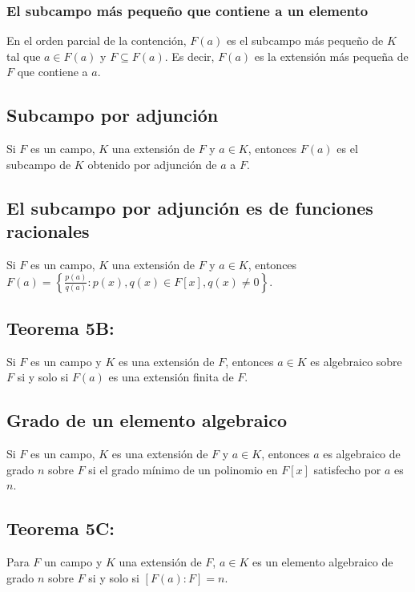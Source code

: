 \documentclass{article}
\begin{document}
\subsubsection*{\color{teal} El subcampo más pequeño que contiene a un elemento}

En el orden parcial de la contención, $F(a)$ es el subcampo más pequeño de $K$ tal que $a\in F(a)$ y $F\subseteq F(a)$. Es decir, $F(a)$ es la extensión más pequeña de $F$ que contiene a $a$. 

\subsection*{\color{violet} Subcampo por adjunción}

Si $F$ es un campo, $K$ una extensión de $F$ y $a\in K$, entonces $F(a)$ es el subcampo de $K$ obtenido por adjunción de $a$ a $F$.
 
\subsection*{\color{purple} El subcampo por adjunción es de funciones racionales}

Si $F$ es un campo, $K$ una extensión de $F$ y $a\in K$, entonces $F(a)=\left\{\displaystyle\frac{p(a)}{q(a)}: p(x),q(x)\in F[x], q(x)\neq0\right\}$.

\subsection*{\color{red} Teorema 5B:}

Si $F$ es un campo y $K$ es una extensión de $F$, entonces $a\in K$ es algebraico sobre $F$ si y solo si $F(a)$ es una extensión finita de $F$.

\subsection*{\color{violet} Grado de un elemento algebraico}

Si $F$ es un campo, $K$ es una extensión de $F$ y $a\in K$, entonces $a$ es algebraico de grado $n$ sobre $F$ si el grado mínimo de un polinomio en $F[x]$ satisfecho por $a$ es $n$.

\subsection*{\color{red} Teorema 5C:}

Para $F$ un campo y $K$ una extensión de $F$, $a\in K$ es un elemento algebraico de grado $n$ sobre $F$ si y solo si $[F(a):F]=n$.
\end{document}
